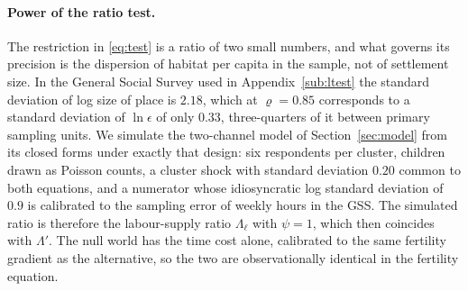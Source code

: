 \documentclass[11pt]{article}
\begin{document}
\paragraph{Power of the ratio test.}
The restriction in \eqref{eq:test} is a ratio of two small numbers, and what governs its precision
is the dispersion of habitat per capita in the sample, not of settlement size. In the General
Social Survey used in Appendix~\ref{sub:ltest} the standard deviation of log size of place is $2.18$, which at
$\varrho=0.85$ corresponds to a standard deviation of $\ln\epsilon$ of only $0.33$, three-quarters of
it between primary sampling units. We simulate the two-channel model of
Section~\ref{sec:model} from its closed forms under exactly that design: six respondents per
cluster, children drawn as Poisson counts, a cluster shock with standard deviation $0.20$ common to
both equations, and a numerator whose idiosyncratic log standard deviation of $0.9$ is calibrated
to the sampling error of weekly hours in the GSS. The simulated ratio is therefore the labour-supply
ratio $\Lambda_\ell$ with $\psi=1$, which then coincides with $\Lambda'$. The null world has the time cost alone,
calibrated to the same fertility gradient as the alternative, so the two are observationally
identical in the fertility equation.
\end{document}
